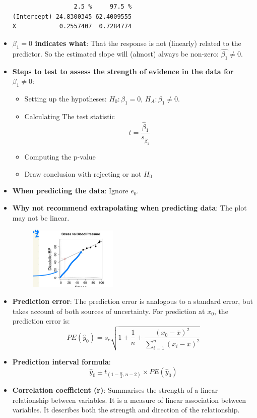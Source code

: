 \documentclass[12pt]{book}
\begin{document}
\begin{itemize}
\begin{mdframed}[backgroundcolor=gray!15, linecolor=black]
\begin{verbatim}
                 2.5 %     97.5 %
(Intercept) 24.8300345 62.4009555
X            0.2557407  0.7284774
\end{verbatim}
\end{mdframed}
\item \textbf{$\beta_1 = 0$ indicates what}: That the response is not (linearly) related to the predictor. So the estimated slope will (almost) always be non-zero: $\hat{\beta_1} \neq 0$.
\item \textbf{Steps to test to assess the strength of evidence in the data for $\beta_1 \neq 0$}:
\begin{itemize}
\item Setting up the hypotheses: $H_0 : \beta_1 = 0$, $H_A : \beta_1 \neq 0$.
\item Calculating The test statistic
$$t = \frac{\hat{\beta}_1}{s_{\hat{\beta}_1}}$$
\item Computing the p-value
\item Draw conclusion with rejecting or not $H_0$
\end{itemize}
\item \textbf{When predicting the data}: Ignore $e_0$.
\item \textbf{Why not recommend extrapolating when predicting data}: The plot may not be linear.
\begin{figure}[H]
    \centering
    \includegraphics[width=0.4\textwidth]{7.jpg}
\end{figure}
\item \textbf{Prediction error}: The prediction error is analogous to a standard error, but takes account of both sources of uncertainty. For prediction at $x_0$, the prediction error is: 
$$PE(\hat{y}_0) = s_e\sqrt{1 + \frac{1}{n} + \frac{(x_0 - \bar{x})^2}{\sum_{i=1}^{n}(x_i - \bar{x})^2}}$$
\item \textbf{Prediction interval formula}:
$$\hat{y}_0 \pm t_{(1-\frac{\alpha}{2}, n-2)} \times PE(\hat{y}_0)$$
\item \textbf{Correlation coefficient (r)}: Summarises the strength of a linear relationship between variables. It is a measure of linear association between variables. It describes both the strength and direction of the relationship.

\end{itemize}
\end{document}
